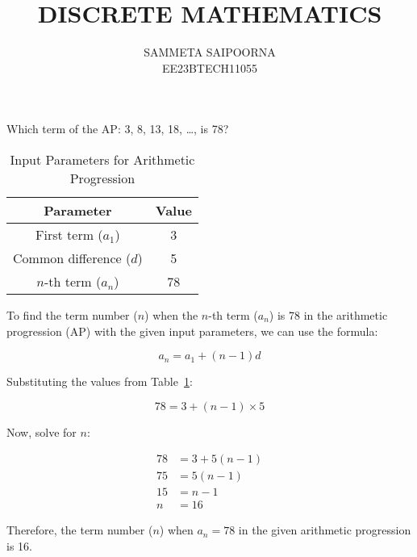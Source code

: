 \documentclass{article}
\title {DISCRETE MATHEMATICS}
\author {SAMMETA SAIPOORNA\\
               EE23BTECH11055}
\begin{document}
Which term of the AP: 3, 8, 13, 18, \ldots, is 78?
\begin{table}[h]
    \centering
    \begin{tabular}{|c|c|}
        \hline
        \textbf{Parameter} & \textbf{Value} \\
        \hline
        First term (\( a_1 \)) & 3 \\
        Common difference (\( d \)) & 5 \\
        \(n\)-th term (\( a_n \)) & 78 \\
        \hline
    \end{tabular}
    \caption{Input Parameters for Arithmetic Progression}
    \label{tab:input_parameters}
\end{table}


To find the term number (\( n \)) when the \(n\)-th term (\( a_n \)) is 78 in the arithmetic progression (AP) with the given input parameters, we can use the formula:

\[ a_n = a_1 + (n-1)d \]

Substituting the values from Table~\ref{tab:input_parameters}:

\[ 78 = 3 + (n-1) \times 5 \]

Now, solve for \( n \):

\begin{align*}
78 &= 3 + 5(n-1) \\
75 &= 5(n-1) \\
15 &= n-1 \\
n &= 16
\end{align*}

Therefore, the term number (\( n \)) when \( a_n = 78 \) in the given arithmetic progression is 16.
\end{document}
